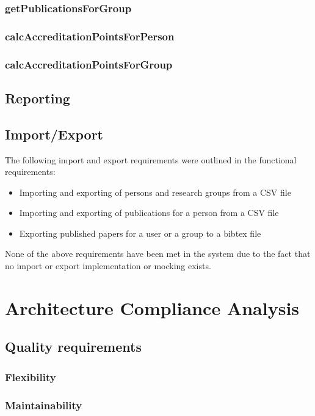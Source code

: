 \documentclass[a4paper,10pt]{article}
\begin{document}
\subsubsection{getPublicationsForGroup}

\subsubsection{calcAccreditationPointsForPerson}

\subsubsection{calcAccreditationPointsForGroup}

\subsection{Reporting}

\subsection{Import/Export}
The following import and export requirements were outlined in the functional requirements:
\begin{itemize}
	\item Importing and exporting of persons and research groups from a CSV file
	\item Importing and exporting of publications for a person from a CSV file
	\item Exporting published papers for a user or a group to a bibtex file
\end{itemize}

None of the above requirements have been met in the system due to the fact that no import or export implementation or mocking exists.

\section{Architecture Compliance Analysis}
\subsection{Quality requirements}
\subsubsection{Flexibility}

\subsubsection{Maintainability}
\end{document}
